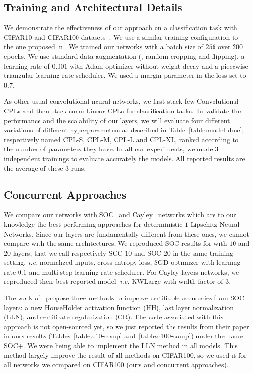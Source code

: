 \subsection{Training and Architectural Details}
\label{sec:setting-xp}

We demonstrate the effectiveness of our approach on a classification task with CIFAR10 and CIFAR100 datasets~\citep{krizhevsky2009learning}. We use a similar training configuration to the one proposed in~\citep{trockman2021orthogonalizing}
We trained our networks with a batch size of $256$ over $200$ epochs.
We use standard data augmentation (\ie, random cropping and flipping), a learning rate of $0.001$ with Adam optimizer \citep{diederik2014adam} without weight decay and a piecewise triangular learning rate scheduler. We used a margin parameter in the loss set to $0.7$.

As other usual convolutional neural networks, we first stack few Convolutional CPLs and then stack some Linear CPLs for classification tasks. To validate the performance  and the scalability of our layers,  we will evaluate four different variations of different hyperparameters as described in Table~\ref{table:model-desc}, respectively named CPL-S, CPL-M, CPL-L and CPL-XL, ranked according to the number of parameters they have. In all our experiments, we made $3$ independent trainings to evaluate accurately the models. All reported results are the average of these $3$ runs.

\subsection{Concurrent Approaches} We compare our networks with SOC~\citep{skew2021sahil} and Cayley~\cite{trockman2021orthogonalizing} networks which are to our knowledge the best performing approaches for deterministic $1$-Lipschitz Neural Networks. Since our layers are fundamentally different from these ones, we cannot compare with the same architectures. We reproduced SOC results for with $10$ and $20$ layers, that we call respectively SOC-$10$ and SOC-$20$ in the same training setting, \emph{i.e.} normalized inputs, cross entropy loss, SGD optimizer with learning rate $0.1$ and multi-step learning rate scheduler. For Cayley layers networks, we reproduced their best reported model, \emph{i.e.} KWLarge with width factor of $3$. 

The work of~\citet{singla2021householder} propose three methods to improve certifiable accuracies from SOC layers: a new HouseHolder activation function (HH),  last layer normalization (LLN), and certificate regularization (CR). The code associated with this approach is not open-sourced yet, so we just reported the results from their paper in ours results (Tables~\ref{table:c10-comp} and~\ref{table:c100-comp}) under the name SOC+. We were being able to implement the LLN method in all models. This method largely improve the result of all methods on CIFAR100, so we used it for all networks we compared on CIFAR100 (ours and concurrent approaches).


